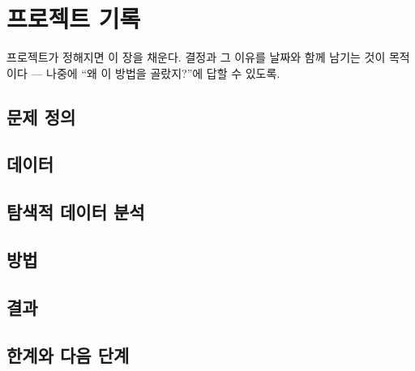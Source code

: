 \chapter{프로젝트 기록}
\label{ch:project}

\begin{aside}
프로젝트가 정해지면 이 장을 채운다. 결정과 그 이유를 날짜와 함께 남기는 것이
목적이다 --- 나중에 ``왜 이 방법을 골랐지?''에 답할 수 있도록.
\end{aside}

\section{문제 정의}
\label{sec:proj-problem}

\section{데이터}
\label{sec:proj-data}

\section{탐색적 데이터 분석}
\label{sec:proj-eda}

\section{방법}
\label{sec:proj-method}

\section{결과}
\label{sec:proj-results}

\section{한계와 다음 단계}
\label{sec:proj-limits}
